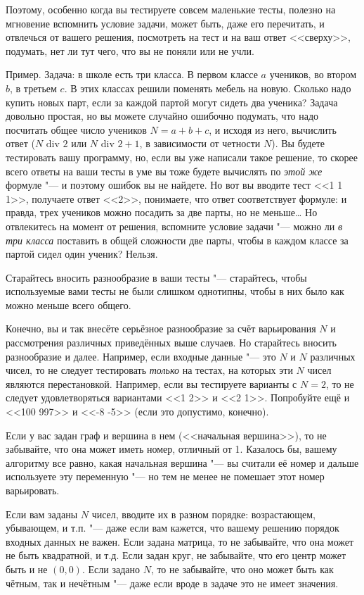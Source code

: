 Поэтому, особенно когда вы тестируете совсем маленькие тесты, полезно на мгновение вспомнить условие задачи, может быть, даже его перечитать,
и отвлечься от вашего решения, посмотреть на тест и на ваш ответ <<сверху>>, подумать, нет ли тут чего, что вы не поняли или не учли.

Пример. Задача: в школе есть три класса. В первом классе $a$ учеников, во втором $b$, в третьем $c$. В этих классах решили поменять мебель на новую.
Сколько надо купить новых парт, если за каждой партой могут сидеть два ученика? 
Задача довольно простая, но вы можете случайно ошибочно подумать, что надо посчитать общее число учеников $N=a+b+c$, и исходя из него, 
вычислить ответ ($N\mbox{ div }2$ или $N\mbox{ div }2+1$, в зависимости от четности $N$). 
Вы будете тестировать вашу программу, но, если вы уже написали такое решение, то скорее всего ответы на ваши тесты в уме вы тоже
будете вычислять по \textit{этой же} формуле "--- и поэтому ошибок вы не найдете. Но вот вы вводите тест <<1 1 1>>, получаете ответ <<2>>,
понимаете, что ответ соответствует формуле: и правда, трех учеников можно посадить за две парты, но не меньше\dots{} 
Но отвлекитесь на момент от решения, вспомните условие задачи "--- можно ли \textit{в три класса} поставить в общей сложности две парты,
чтобы в каждом классе за партой сидел один ученик? Нельзя.

 Старайтесь вносить разнообразие в ваши тесты "--- старайтесь, чтобы используемые вами тесты не были слишком однотипны,
чтобы в них было как можно меньше всего общего.

Конечно, вы и так внесёте серьёзное разнообразие за счёт варьирования $N$ и рассмотрения различных приведённых выше случаев. 
Но старайтесь вносить разнообразие и далее. 
Например, если входные данные "--- это $N$ и $N$ различных чисел, то не следует тестировать \textit{только} на тестах, на которых эти $N$ чисел являются
перестановкой. 
Например, если вы тестируете варианты с $N=2$, то не следует удовлетворяться вариантами <<1 2>> и <<2 1>>. 
Попробуйте ещё и <<100 997>> и <<-8 -5>> (если это допустимо, конечно). 

Если у вас задан граф и вершина в нем (<<начальная вершина>>), то не забывайте, что она может иметь номер, отличный от 1. 
Казалось бы, вашему алгоритму все равно, какая начальная вершина "--- вы считали её номер и дальше используете эту переменную "---
но тем не менее не помешает этот номер варьировать.

Если вам заданы $N$ чисел, вводите их в разном порядке: возрастающем, убывающем, и т.п. "--- даже если вам кажется, что вашему решению порядок входных данных не важен. 
Если задана матрица, то не забывайте, что она может не быть квадратной, и т.д. 
Если задан круг, не забывайте, что его центр может быть и не $(0,0)$.
Если задано $N$, то не забывайте, что оно может быть как чётным, так и нечётным "--- даже если вроде в задаче это не имеет значения.

